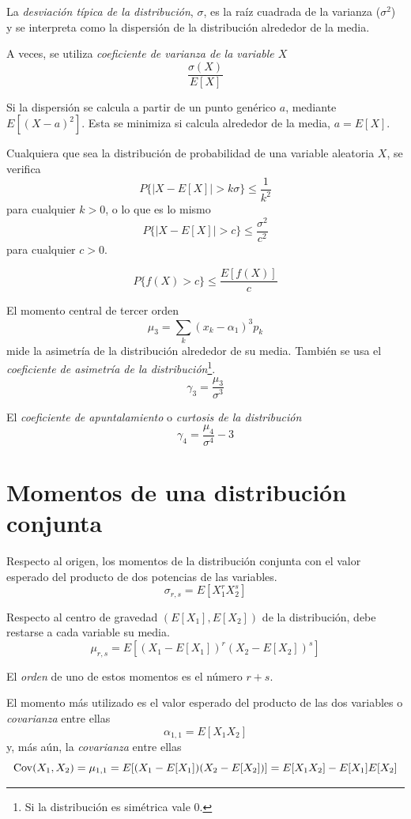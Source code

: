 La \emph{desviación típica de la distribución}, $\sigma$, es la raíz cuadrada de la varianza ($\sigma^2$) y se interpreta como la dispersión de la distribución alrededor de la media.

A veces, se utiliza \emph{coeficiente de varianza de la variable $X$}
\[
\frac{\sigma(X)}{E[X]}
\]

Si la dispersión se calcula a partir de un punto genérico $a$, mediante $E[(X-a)^2]$. Esta se minimiza si calcula alrededor de la media, $a=E[X]$.

\begin{proposition}
    Cualquiera que sea la distribución de probabilidad de una variable aleatoria $X$, se verifica
    \[
    P\{|X-E[X]| > k\sigma\} \leq \frac{1}{k^2}
    \]
    para cualquier $k > 0$, o lo que es lo mismo
    \[
    P\{|X-E[X]| > c\} \leq \frac{\sigma^2}{c^2}
    \]
    para cualquier $c > 0$.
\end{proposition}

\begin{proposition}
\[
P\{f(X)>c\} \leq \frac{E[f(X)]}{c}
\]
\end{proposition}

El momento central de tercer orden
\[
\mu_3 = \sum_k (x_k-\alpha_1)^3 p_k
\]
mide la asimetría de la distribución alrededor de su media. También se usa el \emph{coeficiente de asimetría de la distribución}\footnote{Si la distribución es simétrica vale 0.}.
\[
\gamma_3 = \frac{\mu_3}{\sigma^3}
\]

El \emph{coeficiente de apuntalamiento} o \emph{curtosis de la distribución}
\[
\gamma_4 = \frac{\mu_4}{\sigma^4} - 3
\]

\section{Momentos de una distribución conjunta}

Respecto al origen, los momentos de la distribución conjunta con el valor esperado del producto de dos potencias de las variables.
\[
\sigma_{r,s}=E[X_1^rX_2^s]
\]

Respecto al centro de gravedad $(E[X_1],E[X_2])$ de la distribución, debe restarse a cada variable su media.
\[
\mu_{r,s} = E[(X_1-E[X_1])^r(X_2-E[X_2])^s]
\]

El \emph{orden} de uno de estos momentos es el número $r+s$.

El momento más utilizado es el valor esperado del producto de las dos variables o \emph{covarianza} entre ellas
\[
\alpha_{1,1} = E[X_1X_2]
\]
y, más aún, la \emph{covarianza} entre ellas
\[
\operatorname{Cov}(X_1,X_2) = \mu_{1,1} = E[(X_1 - E[X_1])(X_2 - E[X_2])] = E[X_1X_2]-E[X_1]E[X_2]
\]

